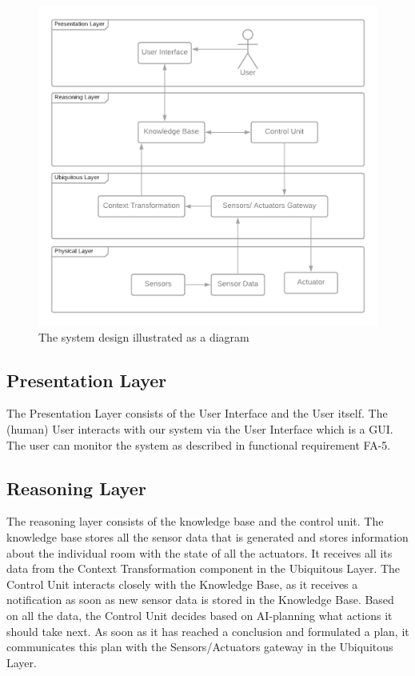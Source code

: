 \documentclass[runningheads]{llncs}
\begin{document}
    \begin{figure}
        \centering
        \includegraphics[width=\linewidth]{img/system-design.png}
        \caption{The system design illustrated as a diagram}
        \label{fig:system-design}
    \end{figure}

    \subsection{Presentation Layer}
    The Presentation Layer consists of the User Interface and the User itself. The (human) User interacts with our system via the User Interface which is a GUI. The user can monitor the system as described in functional requirement FA-5.

    \subsection{Reasoning Layer}
    The reasoning layer consists of the knowledge base and the control unit. The knowledge base stores all the sensor data that is generated and stores information about the individual room with the state of all the actuators. It receives all its data from the Context Transformation component in the Ubiquitous Layer. The Control Unit interacts closely with the Knowledge Base, as it receives a notification as soon as new sensor data is stored in the Knowledge Base. Based on all the data, the Control Unit decides based on AI-planning what actions it should take next. As soon as it has reached a conclusion and formulated a plan, it communicates this plan with the Sensors/Actuators gateway in the Ubiquitous Layer.
\end{document}
